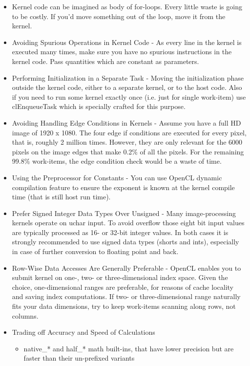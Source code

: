 \documentclass[paper=a4, fontsize=11pt]{scrartcl} %
\numberwithin{equation}{section} %
\numberwithin{figure}{section} %
\numberwithin{table}{section} %
\begin{document}
\begin{itemize}
  \item Kernel code can be imagined as body of for-loops. Every little waste is going to be costly. If you'd move something out of the loop, move it from the kernel.
  \item Avoiding Spurious Operations in Kernel Code - As every line in the kernel is executed many times, make sure you have no spurious instructions in the kernel code. Pass quantities which are constant as parameters.
  \item Performing Initialization in a Separate Task - Moving the initialization phase outside the kernel code, either to a separate kernel, or to the host code. Also if you need to run some kernel exactly once (i.e. just for single work-item) use clEnqueueTask which is specially crafted for this purpose.
  \item Avoiding Handling Edge Conditions in Kernels - Assume you have a full HD image of 1920 x 1080. The four edge if conditions are executed for every pixel, that is, roughly 2 million times. However, they are only relevant for the 6000 pixels on the image edges that make 0.2\% of all the pixels. For the remaining 99.8\% work-items, the edge condition check would be a waste of time.
  \item Using the Preprocessor for Constants - You can use OpenCL dynamic compilation feature to ensure the exponent is known at the kernel compile time (that is still host run time).
  \item Prefer Signed Integer Data Types Over Unsigned - Many image-processing kernels operate on uchar input. To avoid overflow those eight bit input values are typically processed as 16- or 32-bit integer values. In both cases it is strongly recommended to use signed data types (shorts and ints), especially in case of further conversion to floating point and back.
  \item Row-Wise Data Accesses Are Generally Preferable - OpenCL enables you to submit kernel on one-, two- or three-dimensional index space. Given the choice, one-dimensional ranges are preferable, for reasons of cache locality and saving index computations. If two- or three-dimensional range naturally fits your data dimensions, try to keep work-items scanning along rows, not columns.
  \item Trading off Accuracy and Speed of Calculations
  \begin{itemize}
    \item native_* and half_* math built-ins, that have lower precision but are faster than their un-prefixed variants

\end{itemize}
\end{itemize}
\end{document}
